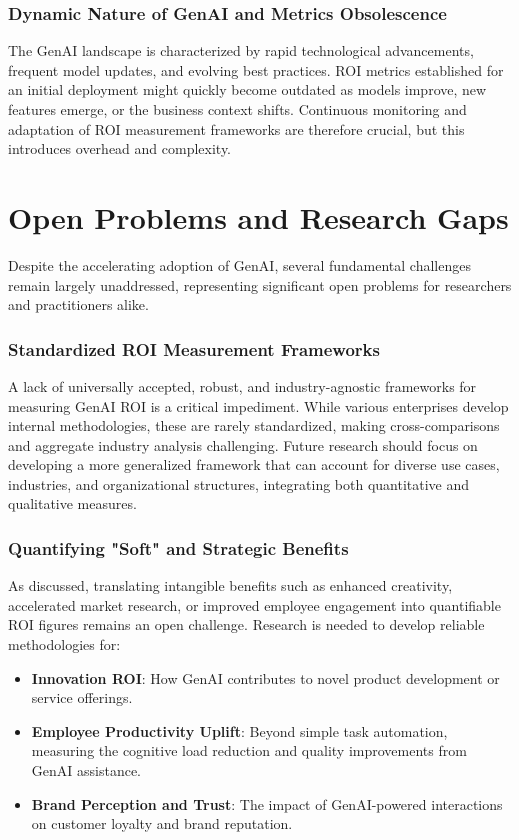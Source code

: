 \documentclass[10pt,twocolumn,letterpaper]{article}
\begin{document}
\subsubsection{Dynamic Nature of GenAI and Metrics Obsolescence}

The GenAI landscape is characterized by rapid technological advancements, frequent model updates, and evolving best practices. ROI metrics established for an initial deployment might quickly become outdated as models improve, new features emerge, or the business context shifts. Continuous monitoring and adaptation of ROI measurement frameworks are therefore crucial, but this introduces overhead and complexity.


\section{Open Problems and Research Gaps}


Despite the accelerating adoption of GenAI, several fundamental challenges remain largely unaddressed, representing significant open problems for researchers and practitioners alike.


\subsubsection{Standardized ROI Measurement Frameworks}

A lack of universally accepted, robust, and industry-agnostic frameworks for measuring GenAI ROI is a critical impediment. While various enterprises develop internal methodologies, these are rarely standardized, making cross-comparisons and aggregate industry analysis challenging. Future research should focus on developing a more generalized framework that can account for diverse use cases, industries, and organizational structures, integrating both quantitative and qualitative measures.


\subsubsection{Quantifying "Soft" and Strategic Benefits}

As discussed, translating intangible benefits such as enhanced creativity, accelerated market research, or improved employee engagement into quantifiable ROI figures remains an open challenge. Research is needed to develop reliable methodologies for:
\begin{itemize}
  \item \textbf{Innovation ROI}: How GenAI contributes to novel product development or service offerings.
  \item \textbf{Employee Productivity Uplift}: Beyond simple task automation, measuring the cognitive load reduction and quality improvements from GenAI assistance.
  \item \textbf{Brand Perception and Trust}: The impact of GenAI-powered interactions on customer loyalty and brand reputation.
\end{itemize}
\end{document}
